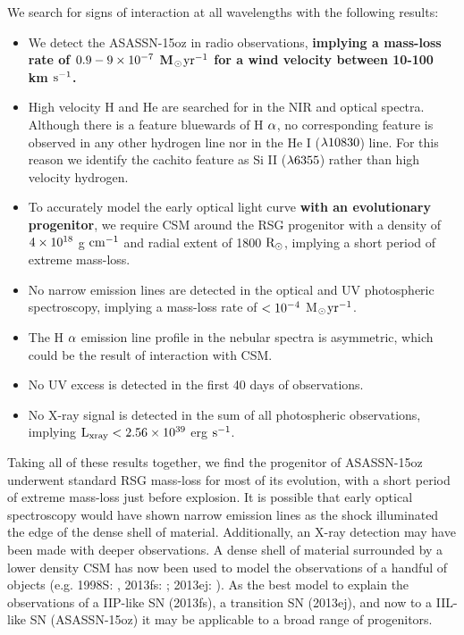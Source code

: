 \documentclass[a4paper,fleqn,usenatbib]{mnras}
\newcommand{\msunperiod}{M$\rm{_{\odot}}$}
\begin{document}
We search for signs of interaction at all wavelengths with the following results:
\begin{itemize}
\item We detect the ASASSN-15oz in radio observations,\textbf{ implying a mass-loss rate of $\rm{0.9-9\times10^{-7}}$ \msunperiod $\rm{yr^{-1}}$ for a wind velocity between 10-100 km $\rm{s^{-1}}$.}
\item High velocity H and He are searched for in the NIR and optical spectra. 
Although there is a feature bluewards of H $\rm{\alpha}$, no corresponding feature is observed in any other hydrogen line nor in the He I ($\rm{\lambda 10830}$) line. 
For this reason we identify the cachito feature as Si II ($\rm{\lambda 6355}$) rather than high velocity hydrogen.
\item To accurately model the early optical light curve \textbf{with an evolutionary progenitor}, we require CSM around the RSG progenitor with a density of $\rm{4\times10^{18}}$ g $\rm{cm^{-1}}$ and radial extent of 1800 $\rm{R_{\odot}}$, implying a short period of extreme mass-loss.
\item No narrow emission lines are detected in the optical and UV photospheric spectroscopy, implying a mass-loss rate of $\rm{< 10^{-4}}$ \msunperiod $\rm{yr^{-1}}$.
\item The H $\rm{\alpha}$ emission line profile in the nebular spectra is asymmetric, which could be the result of interaction with CSM.
\item No UV excess is detected in the first 40 days of observations.
\item No X-ray signal is detected in the sum of all photospheric observations, implying $\rm{L_{xray}<2.56 \times10^{39}}$ erg $\rm{s^{-1}}$.
\end{itemize}
Taking all of these results together, we find the progenitor of ASASSN-15oz underwent standard RSG mass-loss for most of its evolution, with a short period of extreme mass-loss just before explosion. 
It is possible that early optical spectroscopy would have shown narrow emission lines as the shock illuminated the edge of the dense shell of material.
Additionally, an X-ray detection may have been made with deeper observations. 
A dense shell of material surrounded by a lower density CSM has now been used to model the observations of a handful of objects (e.g. 1998S: \citealt{2001chugai}, 2013fs: \citealt{2017yaron}; 2013ej: \citealt{2018morozova2}).
As the best model to explain the observations of a IIP-like SN (2013fs), a transition SN (2013ej), and now to a IIL-like SN (ASASSN-15oz) it may be applicable to a broad range of progenitors.
\end{document}
